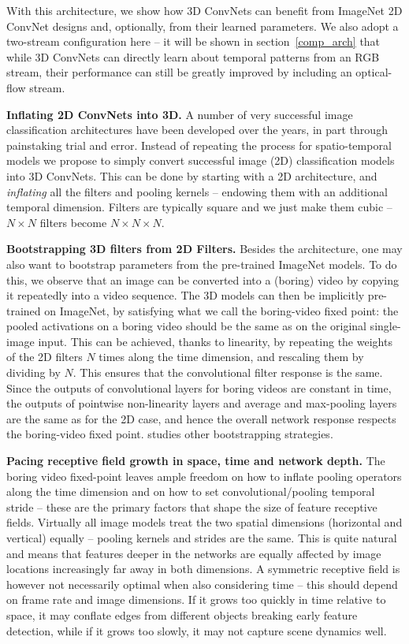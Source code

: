\documentclass[10pt,twocolumn,letterpaper]{article}
\begin{document}
With this architecture, we show how 3D ConvNets can benefit from ImageNet
2D ConvNet designs and, optionally, from their learned parameters. We 
also adopt a two-stream configuration here -- it will be shown in
section~\ref{comp_arch}
that while 3D ConvNets can directly learn about temporal
patterns from an RGB stream, their performance can still be greatly
improved by including an optical-flow stream.

\vspace{3mm}
\noindent \textbf{Inflating 2D ConvNets into 3D.} 
A number of very successful image classification architectures have been 
developed over the years, in part through painstaking trial and
error. Instead of repeating the process for spatio-temporal models we
propose to simply convert successful image (2D) classification  models into 3D
ConvNets. This can be done by starting with a 2D architecture, and
\textit{inflating} all the filters and pooling kernels -- endowing
them with an additional temporal dimension. Filters are typically
square and we just make them cubic -- $N \times N$ filters become $N
\times N \times N$.

\vspace{3mm}
\noindent \textbf{Bootstrapping 3D filters from 2D Filters.} 
Besides the architecture, one may also want to bootstrap parameters
from the pre-trained ImageNet models. To do this, we observe that an
image can be converted into a (boring) video by copying it repeatedly
into a video sequence. The 3D models can then be implicitly pre-trained
on ImageNet, by satisfying what we call the boring-video fixed point:
the pooled activations on a boring video should be the same as on the
original single-image input. This can be achieved, thanks to
linearity, by repeating the weights of the 2D filters $N$ times
along the time dimension, and rescaling them by dividing by $N$. This
ensures that the convolutional filter response is the same. Since the
outputs of convolutional layers for boring videos are constant in
time, the outputs of pointwise non-linearity layers and average and
max-pooling layers are the same as for the 2D case, and hence the
overall network response respects the boring-video fixed point. \cite{MansimovSS15} studies other bootstrapping strategies.

\vspace{3mm}
\noindent \textbf{Pacing receptive field growth in space, time and network depth.} The boring video fixed-point leaves ample freedom on how to inflate pooling operators along the time dimension and on how to set convolutional/pooling temporal stride -- these are the primary factors that shape the size of feature receptive fields. Virtually all image models treat the two spatial dimensions (horizontal and vertical) equally -- pooling kernels and strides are the same. This is quite natural and means that features deeper in the networks are equally affected by image locations increasingly far away in both dimensions. A symmetric receptive field is however not necessarily optimal when also considering time -- this should depend on frame rate and image dimensions. If it grows too quickly in time relative to space, it may conflate edges from different objects breaking early feature detection, while if it grows too slowly, it may not capture scene dynamics well.
\end{document}
